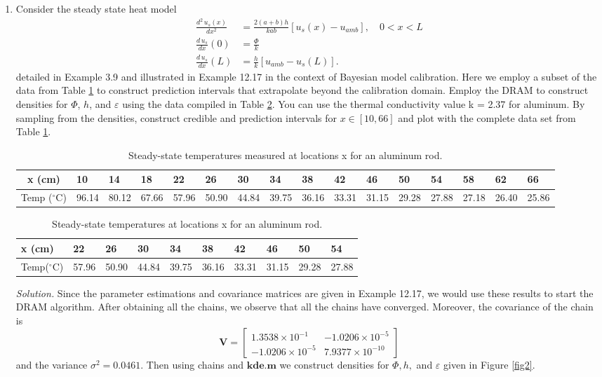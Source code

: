 \documentclass[11pt]{article}
\begin{document}
\begin{enumerate}
\item 
Consider the steady state heat model
\begin{align*}
    \frac{d^2\, u_{s}(x)}{d x^2}&=\frac{2(a+b)h}{kab}[u_{s}(x)-u_{amb}],  \quad 0<x<L\\
   \frac{d\,u_{s}}{dx}(0)& = \frac{\Phi}{k} \\
   \frac{d \,u_{s}}{d x}(L)&= \frac{h}{k} [u_{amb} - u_{s}(L)] .
\end{align*} detailed in Example 3.9 and illustrated in Example 12.17 in the context of Bayesian model calibration. Here we employ a subset of the data from Table \ref{tab2} to construct prediction intervals that extrapolate beyond the calibration domain. Employ the DRAM  to construct densities for $\Phi$, $h$, and $\varepsilon$ using the data compiled in Table \ref{tab3}. You can use the thermal conductivity value k = 2.37 for aluminum. By sampling from the densities, construct credible and prediction intervals for $x\in [10, 66]$ and plot with the complete data set from Table \ref{tab2}. 



\begin{table}[!htb]
\centering
\scriptsize
\begin{tabular}{|c|l|l|l|l|l|l|l|l|l|l|l|l|l|l|l|}
\hline
x (cm)  & 10    & 14    & 18    & 22    & 26    & 30    & 34    & 38    & 42    & 46    & 50    & 54    & 58    & 62    & 66    \\ \hline
Temp ($^{\circ}$C) & 96.14 & 80.12 & 67.66 & 57.96 & 50.90 & 44.84& 39.75 & 36.16 & 33.31 & 31.15 & 29.28& 27.88 & 27.18 & 26.40 & 25.86 \\ \hline
\end{tabular}
\caption{Steady-state  temperatures measured at locations x for an aluminum  rod.}
\label{tab2}
\end{table}
\begin{table}[!htb]
\centering
\begin{tabular}{|l|l|l|l|l|l|l|l|l|l|}
\hline
x (cm)   & 22    & 26    & 30    & 34    & 38    & 42    & 46    & 50    & 54    \\ \hline
Temp($^{\circ}$C) & 57.96 & 50.90 & 44.84 & 39.75 & 36.16 & 33.31 & 31.15 & 29.28 & 27.88 \\ \hline
\end{tabular}
\caption{Steady-state temperatures at locations x for an aluminum rod.}
\label{tab3}
\end{table}

{\em Solution.} Since the parameter estimations and covariance matrices are given in Example 12.17, we would use these results to start the DRAM algorithm. After obtaining all the chains, we observe that all the chains have converged. Moreover, the covariance of the chain is  $$\mathbf{V} = \begin{bmatrix}    1.3538 \times 10^{-1}  & -1.0206 \times 10^{-5} \\ -1.0206 \times 10^{-5} &  7.9377 \times 10^{-10}\end{bmatrix}$$ and the variance $\sigma^2 =0.0461.$ Then using chains and $\mathbf{kde.m}$ we construct densities for $\Phi, h,$ and $\varepsilon$ given in Figure \ref{fig2}.


\end{enumerate}
\end{document}
